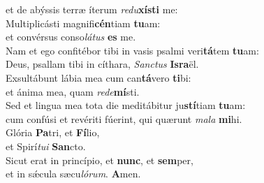 \evenverse et de abýssis terræ íterum \textit{re}\textit{du}\textbf{xí}\textbf{sti} me:\\
\oddverse Multiplicásti magnifi\textbf{cén}tiam \textbf{tu}am:~\*\\
\oddverse et convérsus conso\textit{lá}\textit{tus} \textbf{es} me.\\
\evenverse Nam et ego confitébor tibi in vasis psalmi veri\textbf{tá}tem \textbf{tu}am:~\*\\
\evenverse Deus, psallam tibi in cíthara, \textit{San}\textit{ctus} \textbf{Is}\textbf{ra}ël.\\
\oddverse Exsultábunt lábia mea cum can\textbf{tá}vero \textbf{ti}bi:~\*\\
\oddverse et ánima mea, quam \textit{re}\textit{de}\textbf{mí}sti.\\
\evenverse Sed et lingua mea tota die meditábitur ju\textbf{stí}tiam \textbf{tu}am:~\*\\
\evenverse cum confúsi et revériti fúerint, qui quærunt \textit{ma}\textit{la} \textbf{mi}hi.\\
\oddverse Glória \textbf{Pa}tri, et \textbf{Fí}lio,~\*\\
\oddverse et Spirí\textit{tu}\textit{i} \textbf{San}cto.\\
\evenverse Sicut erat in princípio, et \textbf{nunc}, et \textbf{sem}per,~\*\\
\evenverse et in sǽcula sæcu\textit{ló}\textit{rum}. \textbf{A}men.\\
